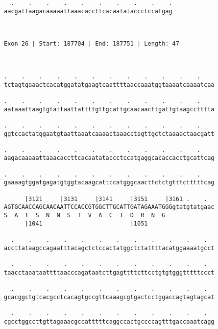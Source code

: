 \documentclass{article}
\begin{document}
\begin{Verbatim}
  .    .    .    .    .    .    .    .    .    .
aacgattaagacaaaaattaaacaccttcacaatataccctccatgag
                                                
                                                
 
Exon 26 | Start: 187704 | End: 187751 | Length: 47



.    .    .    .    .    .    .    .    .    .    .    .    
tctagtgaaactcacatggatatgaagtcaattttaaccaaatggtaaaatcaaaatcaa
                                                            
.    .    .    .    .    .    .    .    .    .    .    .    
aataaattaagtgtattaattattttgttgcattgcaacaacttgattgtaagcctttta
                                                            
.    .    .    .    .    .    .    .    .    .    .    .    
ggtccactatggaatgtaattaaatcaaaactaaacctagttgctctaaaactaacgatt
                                                            
.    .    .    .    .    .    .    .    .    .    .    .    
aagacaaaaattaaacaccttcacaatataccctccatgaggcacaccacctgcattcag
                                                            
.    .    .    .    .    .    .    .    .    .    .    .    
gaaaagtggatgagatgtggtacaagcattccatgggcaacttctctgtttctttttcag
                                                            
      |3121     |3131     |3141     |3151     |3161 .    .  
AGTGCAACCAGCAACAATTCCACCGTGGCTTGCATTGATAGAAATGGGgtatgtatgaac
S  A  T  S  N  N  S  T  V  A  C  I  D  R  N  G              
      |1041                         |1051                   
  
  .    .    .    .    .    .    .    .    .    .    .    .  
accttataagccagaatttacagctctccactatggctctattttacatggaaaatgcct
                                                            
  .    .    .    .    .    .    .    .    .    .    .    .  
taacctaaataattttaacccagataatcttgagttttcttcctgtgtgggtttttccct
                                                            
  .    .    .    .    .    .    .    .    .    .    .    .  
gcacggctgtcacgcctcacagtgccgttcaaagcgtgactcctggaccagtagtagcat
                                                            
  .    .    .    .    .    .    .    .    .    .    .    .  
cgcctggccttgttagaaacgccatttttcaggccactgccccagtttgaccaaatcagg
                                                            

\end{Verbatim}
\end{document}
